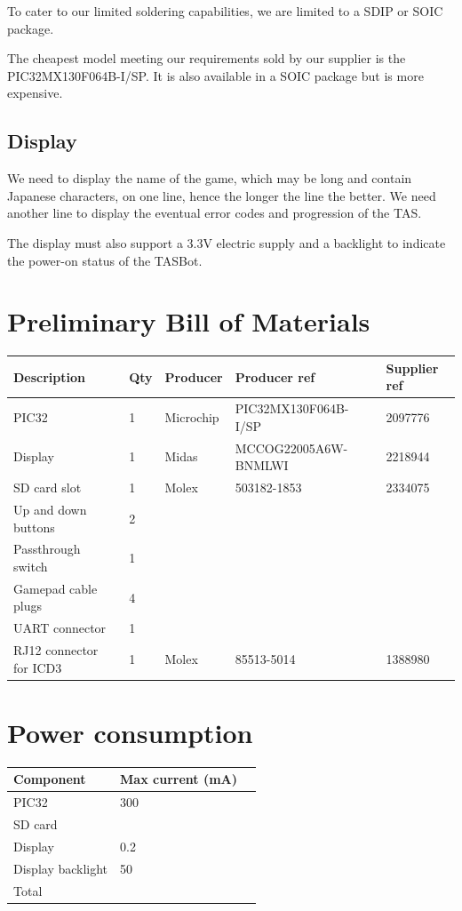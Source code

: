 \documentclass[a4paper,oneside,12pt]{article}
\begin{document}
To cater to our limited soldering capabilities, we are limited to a SDIP or
SOIC package.

The cheapest model meeting our requirements sold by our supplier is the
PIC32MX130F064B-I/SP. It is also available in a SOIC package but is more
expensive.

\subsection{Display}
We need to display the name of the game, which may be long and contain Japanese
characters, on one line, hence the longer the line the better. We need another
line to display the eventual error codes and progression of the TAS.

The display must also support a 3.3V electric supply and a backlight to indicate
the power-on status of the TASBot.

\section{Preliminary Bill of Materials}
\begin{tabular}{|l|l|l|l|l|}
  \hline
  Description & Qty & Producer & Producer ref & Supplier ref \\
  \hline
  PIC32 & 1 & Microchip & PIC32MX130F064B-I/SP & 2097776 \\
  \hline
  Display & 1 & Midas & MCCOG22005A6W-BNMLWI & 2218944 \\
  \hline
  SD card slot & 1 & Molex & 503182-1853 & 2334075 \\
  \hline
  Up and down buttons & 2 & & &\\
  \hline
  Passthrough switch & 1 & & &\\
  \hline
  Gamepad cable plugs & 4 & & &\\
  \hline
  UART connector & 1 & & &\\
  \hline
  RJ12 connector for ICD3 & 1 & Molex & 85513-5014 & 1388980 \\
  \hline
\end{tabular}

\section{Power consumption}
\begin{tabular}{|l|l|l|}
  \hline
  Component & Max current (\si{\mA}) \\
  \hline
  PIC32 & 300 \\
  \hline
  SD card & \\
  \hline
  Display & 0.2 \\
  \hline
  Display backlight & 50 \\
  \hline
  Total & \\
  \hline
\end{tabular}
\end{document}

